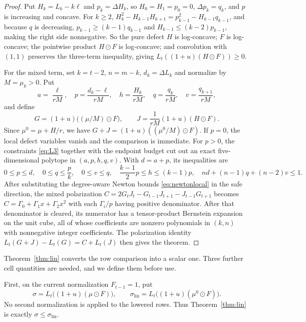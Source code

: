 \documentclass[11pt,a4paper]{article}
\theoremstyle{plain}
\theoremstyle{definition}
\theoremstyle{remark}
\begin{document}
\begin{proof}
Put $H_k=L_k-k\ell$ and $p_k=\Delta H_k$, so $H_0=H_1=p_0=0$, $\Delta p_k=q_k$,
and $p$ is increasing and concave. For $k\ge2$,
$H_k^2-H_{k-1}H_{k+1}=p_{k-1}^2-H_{k-1}q_{k-1}$, and because $q$ is decreasing,
$p_{k-1}\ge(k-1)q_{k-1}$ and $H_{k-1}\le(k-2)p_{k-1}$, making the right side
nonnegative. So the pure defect $H$ is log-concave; $F$ is log-concave; the
pointwise product $H\odot F$ is log-concave; and convolution with $(1,1)$
preserves the three-term inequality, giving
$L_t((1+u)(H\odot F))\ge0$.

For the mixed term, set $k=t-2$, $n=m-k$, $d_k=\Delta L_k$ and normalize by
$M=\mu_k>0$. Put
\[
 a=\frac{\ell}{rM},\quad p=\frac{d_k-\ell}{rM},\quad
 h=\frac{H_k}{rM},\quad q=\frac{q_k}{rM},\quad
 v=\frac{q_{k+1}}{rM},
\]
and define
\[
 G=(1+u)\bigl((\mu/M)\odot F\bigr),\qquad
 J=\frac{1}{rM}(1+u)(H\odot F).
\]
Since $\mu^0=\mu+H/r$, we have
$G+J=(1+u)((\mu^0/M)\odot F)$. If $p=0$, the local defect variables vanish
and the comparison is immediate. For $p>0$, the constraints \eqref{eq:L3}
together with the endpoint budget cut out an exact five-dimensional polytope
in $(a,p,h,q,v)$. With $d=a+p$, its inequalities are
\[
 0\le p\le d,\quad 0\le q\le\frac pk,\quad 0\le v\le q,
 \quad \frac{k-1}{2}p\le h\le(k-1)p,
 \quad nd+(n-1)q+(n-2)v\le1.
\]
After substituting the degree-aware Newton bounds
\eqref{eq:newtonlocal} in the safe direction, the mixed polarization
$C=2G_tJ_t-G_{t-1}J_{t+1}-J_{t-1}G_{t+1}$ becomes
$C=\Gamma_0+\Gamma_1x+\Gamma_2x^2$ with each $\Gamma_i/p$ having positive
denominator. After that denominator is cleared, its numerator has a
tensor-product Bernstein expansion on the unit cube, all of whose coefficients
are nonzero polynomials in $(k,n)$ with nonnegative integer coefficients. The polarization identity
$L_t(G+J)-L_t(G)=C+L_t(J)$ then gives the theorem.
\end{proof}

Theorem~\ref{thm:lin} converts the row comparison into a scalar one. Three
further cell quantities are needed, and we define them before use.

First, on the current normalization $F_{t-1}=1$, put
\[
 \sigma=L_t\bigl((1+u)(\mu\odot F)\bigr),\qquad
 \sigma_{\mathrm{lin}}=L_t\bigl((1+u)(\mu^0\odot F)\bigr).
\]
No second normalization is applied to the lowered rows. Thus
Theorem~\ref{thm:lin} is exactly
$\sigma\le\sigma_{\mathrm{lin}}$.
\end{document}
